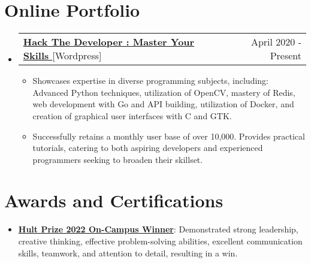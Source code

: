 \documentclass[letterpaper,11pt]{article}
\makeatletter
\newcommand{\resumeItem}[1]{
  \item\small{
    {#1 \vspace{-2pt}}
  }
}
\newcommand{\resumeProjectHeading}[2]{
    \item
    \begin{tabular*}{0.97\textwidth}{l@{\extracolsep{\fill}}r}
      \small#1 & #2 \\
    \end{tabular*}\vspace{-7pt}
}
\newcommand{\resumeSubHeadingListStart}{\begin{itemize}[leftmargin=0.15in, label={}]}
\newcommand{\resumeSubHeadingListEnd}{\end{itemize}}
\newcommand{\resumeItemListStart}{\begin{itemize}}
\newcommand{\resumeItemListEnd}{\end{itemize}\vspace{-5pt}}
\makeatother
\begin{document}

\section{Online Portfolio}

\resumeSubHeadingListStart
      \resumeProjectHeading
          {\textbf{\href{https://hackthedeveloper.com} {Hack The Developer : Master Your Skills }}{[Wordpress]}}{ April 2020 - Present}
          \resumeItemListStart
           \resumeItem{Showcases expertise in diverse programming subjects, including: Advanced Python techniques, utilization of OpenCV, mastery of Redis, web development with Go and API building, utilization of Docker, and creation of graphical user interfaces with C and GTK.}
           \resumeItem{Successfully retains a monthly user base of over 10,000. Provides practical tutorials, catering to both aspiring developers and experienced programmers seeking to broaden their skillset.}
          \resumeItemListEnd
    \resumeSubHeadingListEnd

\section{Awards and Certifications}
 \begin{itemize}[leftmargin=0.15in, label={}]
    \small{\item{
        \resumeItemListStart
            \resumeItem{\textbf{\href{https://www.linkedin.com/posts/dshekhar17_hultprize2022-hultprizekiit-kiituniversity-activity-6899007358467743746-6hZ3}{Hult Prize 2022 On-Campus Winner}}: Demonstrated strong leadership, creative thinking, effective problem-solving abilities, excellent communication skills, teamwork, and attention to detail, resulting in a win.}
            
      \resumeItemListEnd
    }}
 \end{itemize}
\end{document}
